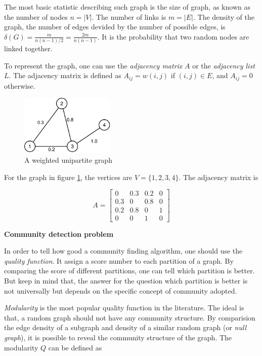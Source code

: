 The most basic statistic describing such graph is the size of graph, as known as the number of nodes $n = |V|$.
The number of links is $m = |E|$.
The density of the graph, the number of edges devided by the number of possible edges, is $\delta(G) = \frac{m}{n(n-1)/2} = \frac{2m}{n(n-1)}$.
It is the probability that two random nodes are linked together.

To represent the graph, one can use the \textit{adjacency matrix} $A$ or the \textit{adjacency list} $L$.
The adjacency matrix is defined as $A_{ij} = w(i, j)$ if $(i, j) \in E$, and $A_{ij} = 0$ otherwise.

\begin{figure}[H]
	\centering
	\includegraphics[width=0.4\textwidth]{images/weighted-unipartite.pdf}
	\caption{A weighted unipartite graph}
	\label{fig:weighted-unipartite-graph}
\end{figure}

For the graph in figure \ref{fig:weighted-unipartite-graph},
the vertices are $V = \{1, 2, 3, 4\}$.
The adjacency matrix is

\begin{equation*}
	A =
	\begin{bmatrix}
		0   & 0.3 & 0.2 & 0 \\
		0.3 & 0   & 0.8 & 0 \\
		0.2 & 0.8 & 0   & 1 \\
		0   & 0   & 1   & 0
	\end{bmatrix}
\end{equation*}

\textbf{Community detection problem}

In order to tell how good a community finding algorithm, one should use the \textit{quality function}.
It assign a score number to each partition of a graph.
By comparing the score of different partitions, one can tell which partition is better.
But keep in mind that, the answer for the question which partition is better is not universally
but depends on the specific concept of community adopted.

\textit{Modularity}\cite{newman2004} is the most popular quality function in the literature.
The ideal is that, a random graph should not have any community structure.
By comparision the edge density of a subgraph and density of a similar random graph (or \textit{null graph}),
it is possible to reveal the community structure of the graph.
The modularity $Q$ can be defined as

